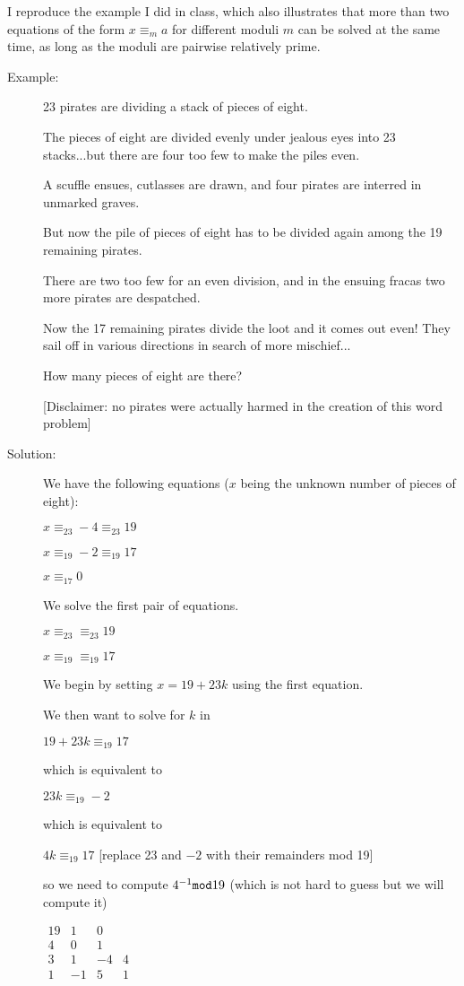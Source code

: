 \documentclass[12pt]{article}
\begin{document}
I reproduce the example I did in class, which also illustrates that more than two equations of the form $x \equiv_m a$ for different moduli $m$ can be solved at the same time, as long as the moduli are pairwise relatively prime.

\begin{description}

\item[Example:]  23 pirates are dividing a stack of pieces of eight.

The pieces of eight are divided evenly under jealous eyes into 23 stacks...but there are four too few to make the piles even.

A scuffle ensues, cutlasses are drawn, and four pirates are interred in unmarked graves.

But now the pile of pieces of eight has to be divided again among the 19 remaining pirates.

There are two too few for an even division, and in the ensuing fracas two more pirates are despatched.

Now the 17 remaining pirates divide the loot and it comes out even!  They sail off in various directions in search of more mischief...

How many pieces of eight are there?

[Disclaimer:  no pirates were actually harmed in the creation of this word problem]

\item[Solution:]

We have the following equations ($x$ being the unknown number of pieces of eight):

$x \equiv_{23} -4 \equiv_{23} 19$

$x \equiv_{19} -2 \equiv_{19} 17$

$x \equiv_{17} 0$

We solve the first pair of equations.

$x \equiv_{23} \equiv_{23} 19$

$x \equiv_{19} \equiv_{19} 17$

We begin by setting $x=19+23k$ using the first equation.

We then want to solve for $k$ in

$19+23k\equiv_{19} 17$

which is equivalent to 

$23k \equiv_{19}-2$

which is equivalent to 

$4k \equiv_{19} 17$ [replace 23 and $-2$ with their remainders mod 19]

so we need to compute $4^{-1}{\tt mod} 19$ (which is not hard to guess but we will compute it)

$\begin{array}{cccc}

19 & 1 & 0 & \\
4 & 0 & 1 &\\
3 & 1 & -4 & 4\\
1 & -1 & 5 & 1 \\
\end{array}$

\end{description}
\end{document}
